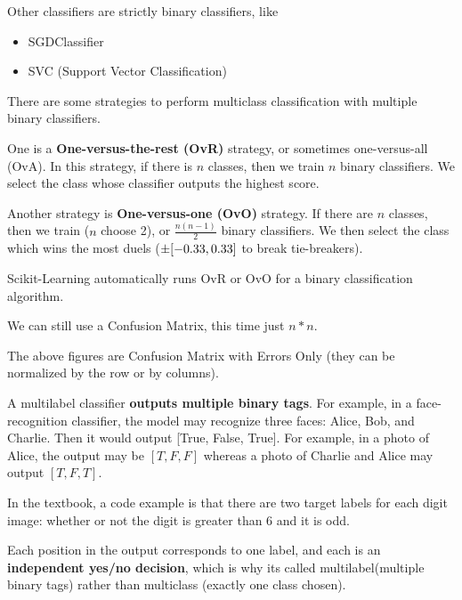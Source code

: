 {Other classifiers are strictly binary classifiers, like
\begin{itemize}
    \item SGDClassifier
    \item SVC (Support Vector Classification)
\end{itemize}
\vs


There are some strategies to perform multiclass classification with multiple binary classifiers.

One is a \textbf{One-versus-the-rest (OvR)} strategy, or sometimes one-versus-all (OvA). In this strategy, if there is $n$ classes, then we train $n$ binary classifiers. We select the class whose classifier outputs the highest score.

Another strategy is \textbf{One-versus-one (OvO)} strategy. If there are $n$ classes, then we train ($n$ choose 2), or $\frac{n(n-1)}{2}$ binary classifiers. We then select the class which wins the most duels ($\pm \space [-0.33,0.33]$ to break tie-breakers).

Scikit-Learning automatically runs OvR or OvO for a binary classification algorithm.



We can still use a Confusion Matrix, this time just $n*n$.


The above figures are Confusion Matrix with Errors Only (they can be normalized by the row or by columns).


A multilabel classifier \textbf{outputs multiple binary tags}. For example, in a face-recognition classifier, the model may recognize three faces: Alice, Bob, and Charlie. Then it would output [True, False, True]. For example, in a photo of Alice, the output may be $[T,F,F]$ whereas a photo of Charlie and Alice may output $[T,F,T]$.

In the textbook, a code example is that there are two target labels for each digit image: whether or not the digit is greater than 6 and it is odd.

Each position in the output corresponds to one label, and each is an \textbf{independent yes/no decision}, which is why its called multilabel(multiple binary tags) rather than multiclass (exactly one class chosen).

}
